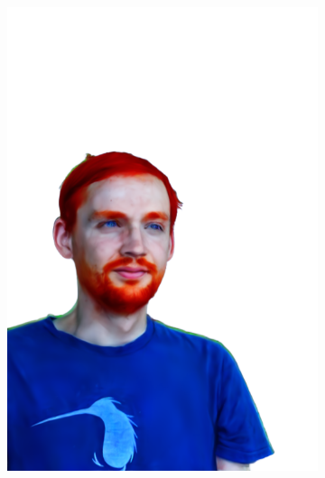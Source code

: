 \begin{figure}[ht]
\begin{subfigure}{0.08\linewidth}
        \includegraphics[width=\textwidth]{Figures/results/high/simon_red/11_render.png}
	\end{subfigure}
	\begin{subfigure}{0.08\linewidth}%

\end{subfigure}
\end{figure}
